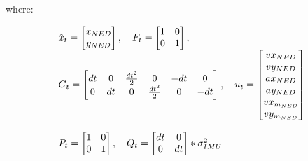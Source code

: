 \documentclass[conference]{IEEEtran}
\begin{document}
where:

\begin{equation*}
\begin{array}{l}


 \hat{x}_{t} = \begin{bmatrix} 
                x_{NED} \\ 
                y_{NED}
                \end{bmatrix} ,  \quad
F_{t} = \begin{bmatrix} 
                1 & 0 \\ 
                0 & 1
                \end{bmatrix}      , \\
G_{t} =   \begin{bmatrix} 
                dt & 0 & \frac{dt^{2}}{2} & 0 & -dt & 0\\ 
                0 & dt & 0 & \frac{dt^{2}}{2} &0 & -dt
                \end{bmatrix} , \quad
u_{t} = \begin{bmatrix} 
                vx_{NED} \\ 
                vy_{NED} \\
                ax_{NED} \\
                ay_{NED} \\
                vx_{m_{NED}}\\
                vy_{m_{NED}}
                \end{bmatrix}  \\ \\
                
P_{t} =  \begin{bmatrix} 
                1 & 0 \\ 
                0 & 1
                \end{bmatrix}   , \quad 
Q_{t}  =\begin{bmatrix} 
                dt & 0 \\ 
                0 & dt
                \end{bmatrix} *\sigma^{2}_{IMU} 
\end{array} \\
\end{equation*}
\end{document}
